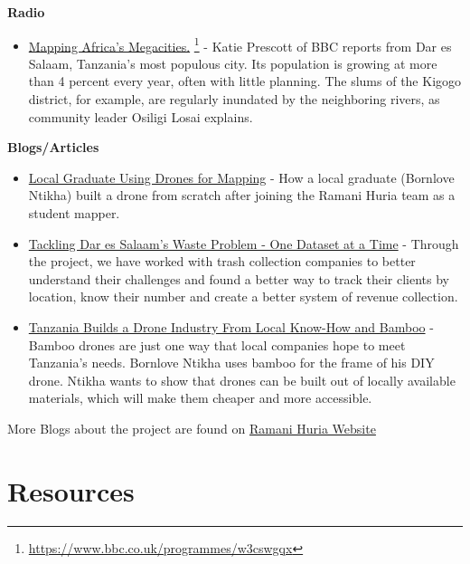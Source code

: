 \documentclass[a4paper,12pt,twoside]{article}
\begin{document}
\newpage
\textbf{Radio}

	\begin{itemize}
		\item \href{https://www.bbc.co.uk/programmes/w3cswgqx}{Mapping Africa's Megacities.} \footnote{\url{https://www.bbc.co.uk/programmes/w3cswgqx}}
		- Katie Prescott of BBC reports from Dar es Salaam, Tanzania's most populous city. Its population is growing at more than 4 percent every year, often with little planning. The slums of the  Kigogo district, for example, are regularly inundated by the neighboring rivers, as community leader Osiligi Losai explains.
	\end{itemize}

\textbf{Blogs/Articles}

	\begin{itemize}
		\item \href{https://www.thecitizen.co.tz/magazine/success/-Local-graduate-using-drones-for-mapping/1843788-4967500-c6pj0rz/index.html}{Local Graduate Using Drones for Mapping}
		- How a local graduate (Bornlove Ntikha) built a drone from scratch after joining the Ramani Huria team as a student mapper.
		\item \href{https://www.ippmedia.com/en/features/hot-tackles-dar-es-salaamE28099s-waste-problem-one-dataset-time}{Tackling Dar es Salaam’s Waste Problem - One Dataset at a Time} 
		- Through the project, we have worked with trash collection companies to better understand their challenges and found a better way to track their clients by location, know their number and create a better system of revenue collection.
		\item \href{https://spectrum.ieee.org/robotics/drones/tanzanias-homegrown-drone-industry-takes-off-on-bamboo-wings}{ Tanzania Builds a Drone Industry From Local Know-How and Bamboo}
		- Bamboo drones are just one way that local companies hope to meet Tanzania’s needs. Bornlove Ntikha uses bamboo for the frame of his DIY drone. Ntikha wants to show that drones can be built out of locally available materials, which will make them cheaper and more accessible.
	\end{itemize}

More Blogs about the project are found on \href{http://ramanihuria.org/news/}{Ramani Huria Website}

\newpage
\section{Resources}
\end{document}
